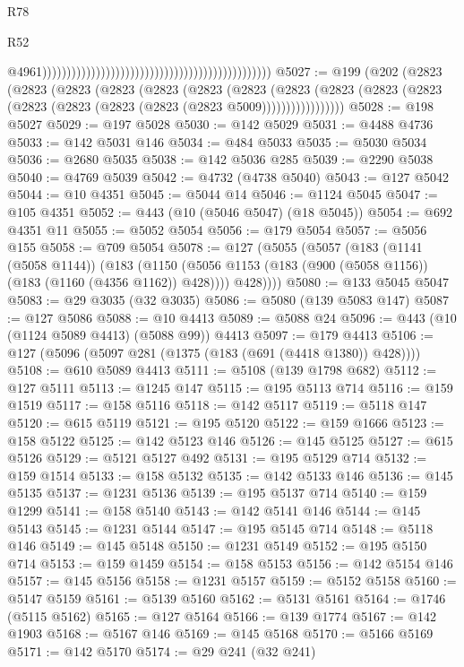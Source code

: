 \begin{lexlean}{R78}
\begin{lexlean}{R52}
\begin{coremodule}
{{{{{{{{{{{{{{{{{{{{{{{{{{{{{{{{{{{{{{{{{{{{{{{{{{{{{{{{{{{{{{{{{{{{{{{{{{{{{{{{{{{{{{{{{{{{{{{{{{{{{{{{{{{{{{{{{{{{{{{{{{{{{{{{{{{{{{{{{{{{{{{{{{{{{{{{{{{{{{{{{{{{{{{{{{{{{{{{{{{{{{{{{{{{{{{{{{{{{{                                                                                                  @4961)))))))))))))))))))))))))))))))))))))))))))))))
@5027 := @199
    (@202
      (@2823
        (@2823
          (@2823
            (@2823
              (@2823
                (@2823
                  (@2823
                    (@2823
                      (@2823 (@2823 (@2823 (@2823 (@2823 (@2823 (@2823 (@2823 @5009)))))))))))))))))
@5028 := @198 @5027
@5029 := @197 @5028
@5030 := @142 @5029
@5031 := @4488 @4736
@5033 := @142 @5031 @146
@5034 := @484 @5033
@5035 := @5030 @5034
@5036 := @2680 @5035
@5038 := @142 @5036 @285
@5039 := @2290 @5038
@5040 := @4769 @5039
@5042 := @4732 (@4738 @5040)
@5043 := @127 @5042
@5044 := @10 @4351
@5045 := @5044 @14
@5046 := @1124 @5045
@5047 := @105 @4351
@5052 := @443 (@10 (@5046 @5047) (@18 @5045))
@5054 := @692 @4351 @11
@5055 := @5052 @5054
@5056 := @179 @5054
@5057 := @5056 @155
@5058 := @709 @5054
@5078 := @127
    (@5055
      (@5057
        (@183
          (@1141 (@5058 @1144))
          (@183
            (@1150 (@5056 @1153 (@183 (@900 (@5058 @1156)) (@183 (@1160 (@4356 @1162)) @428))))
            @428))))
@5080 := @133 @5045 @5047
@5083 := @29 @3035 (@32 @3035)
@5086 := @5080 (@139 @5083 @147)
@5087 := @127 @5086
@5088 := @10 @4413
@5089 := @5088 @24
@5096 := @443 (@10 (@1124 @5089 @4413) (@5088 @99)) @4413
@5097 := @179 @4413
@5106 := @127 (@5096 (@5097 @281 (@1375 (@183 (@691 (@4418 @1380)) @428))))
@5108 := @610 @5089 @4413
@5111 := @5108 (@139 @1798 @682)
@5112 := @127 @5111
@5113 := @1245 @147
@5115 := @195 @5113 @714
@5116 := @159 @1519
@5117 := @158 @5116
@5118 := @142 @5117
@5119 := @5118 @147
@5120 := @615 @5119
@5121 := @195 @5120
@5122 := @159 @1666
@5123 := @158 @5122
@5125 := @142 @5123 @146
@5126 := @145 @5125
@5127 := @615 @5126
@5129 := @5121 @5127 @492
@5131 := @195 @5129 @714
@5132 := @159 @1514
@5133 := @158 @5132
@5135 := @142 @5133 @146
@5136 := @145 @5135
@5137 := @1231 @5136
@5139 := @195 @5137 @714
@5140 := @159 @1299
@5141 := @158 @5140
@5143 := @142 @5141 @146
@5144 := @145 @5143
@5145 := @1231 @5144
@5147 := @195 @5145 @714
@5148 := @5118 @146
@5149 := @145 @5148
@5150 := @1231 @5149
@5152 := @195 @5150 @714
@5153 := @159 @1459
@5154 := @158 @5153
@5156 := @142 @5154 @146
@5157 := @145 @5156
@5158 := @1231 @5157
@5159 := @5152 @5158
@5160 := @5147 @5159
@5161 := @5139 @5160
@5162 := @5131 @5161
@5164 := @1746 (@5115 @5162)
@5165 := @127 @5164
@5166 := @139 @1774
@5167 := @142 @1903
@5168 := @5167 @146
@5169 := @145 @5168
@5170 := @5166 @5169
@5171 := @142 @5170
@5174 := @29 @241 (@32 @241)
}}}}}}}}}}}}}}}}}}}}}}}}}}}}}}}}}}}}}}}}}}}}}}}}}}}}}}}}}}}}}}}}}}}}}}}}}}}}}}}}}}}}}}}}}}}}}}}}}}}}}}}}}}}}}}}}}}}}}}}}}}}}}}}}}}}}}}}}}}}}}}}}}}}}}}}}}}}}}}}}}}}}}}}}}}}}}}}}}}}}}}}}}}}}}}}}}}}}}}
\end{coremodule}
\end{lexlean}
\end{lexlean}
